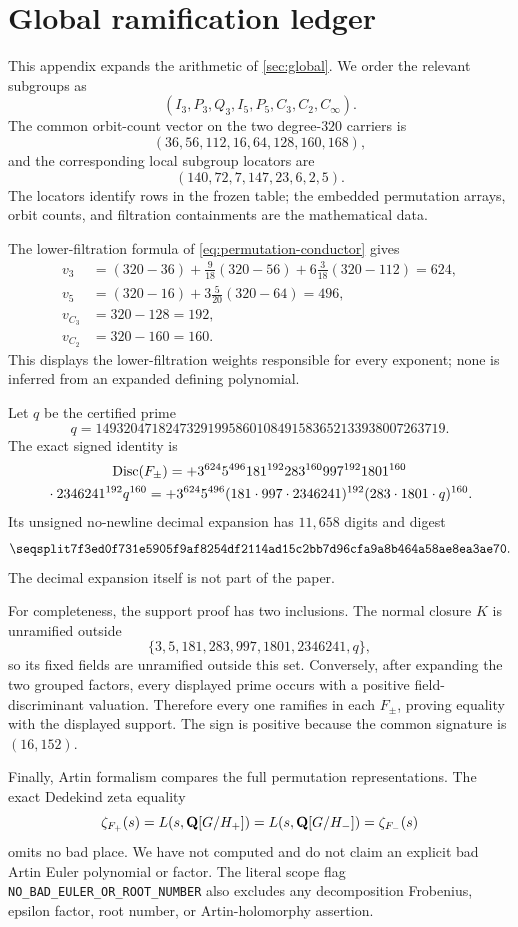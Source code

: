 \section{Global ramification ledger}
\label{app:global-ledger}

This appendix expands the arithmetic of \cref{sec:global}.  We order the
relevant subgroups as
\[
 (I_3,P_3,Q_3,I_5,P_5,C_3,C_2,C_\infty).
\]
The common orbit-count vector on the two degree-$320$ carriers is
\[
 (36,56,112,16,64,128,160,168),
\]
and the corresponding local subgroup locators are
\[
 (140,72,7,147,23,6,2,5).
\]
The locators identify rows in the frozen table; the embedded permutation
arrays, orbit counts, and filtration containments are the mathematical
data.

The lower-filtration formula of \cref{eq:permutation-conductor} gives
\begin{align*}
 v_3&=(320-36)+\frac{9}{18}(320-56)
        +6\frac{3}{18}(320-112)=624,\\
 v_5&=(320-16)+3\frac{5}{20}(320-64)=496,\\
 v_{C_3}&=320-128=192,\\
 v_{C_2}&=320-160=160.
\end{align*}
This displays the lower-filtration weights responsible for every exponent;
none is inferred from an expanded defining polynomial.

Let $q$ be the certified prime
\[
 q=14932047182473291995860108491583652133938007263719.
\]
The exact signed identity is
\begin{multline*}
 \operatorname{Disc}(F_\pm)=+
 3^{624}5^{496}181^{192}283^{160}997^{192}1801^{160}\\
 {}\cdot2346241^{192}q^{160}
 =+3^{624}5^{496}(181\cdot997\cdot2346241)^{192}
   (283\cdot1801\cdot q)^{160}.
\end{multline*}
Its unsigned no-newline decimal expansion has $11{,}658$ digits and digest
\[
 \hexsha{7f3ed0f731e5905f9af8254df2114ad15c2bb7d96cfa9a8b464a58ae8ea3ae70}.
\]
The decimal expansion itself is not part of the paper.

For completeness, the support proof has two inclusions.  The normal closure
$K$ is unramified outside
\[
 \{3,5,181,283,997,1801,2346241,q\},
\]
so its fixed fields are unramified outside this set.  Conversely, after
expanding the two grouped factors, every displayed prime occurs with a
positive field-discriminant valuation.  Therefore every one ramifies in
each $F_\pm$, proving equality with the displayed support.  The sign is
positive because the common signature is $(16,152)$.

Finally, Artin formalism compares the full permutation representations.  The
exact Dedekind zeta equality
\[
 \zeta_{F_+}(s)=L(s,\mathbf{Q}[G/H_+])
 =L(s,\mathbf{Q}[G/H_-])=\zeta_{F_-}(s)
\]
omits no bad place.  We have not computed and do not claim an explicit bad
Artin Euler polynomial or factor.  The literal scope flag
\texttt{NO\_BAD\_EULER\_OR\_ROOT\_NUMBER} also excludes any decomposition
Frobenius, epsilon factor, root number, or Artin-holomorphy assertion.

